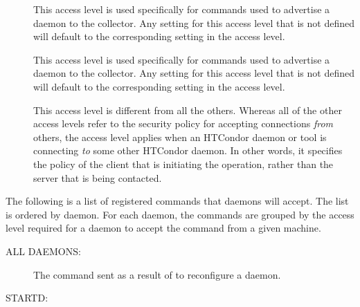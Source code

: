 \begin{description}
\item[] \label{sec-level-advertise-master} This
   access level is used specifically for commands used to advertise a
    daemon to the collector.  Any setting for this access
   level that is not defined will default to the corresponding setting
   in the  access level.

\item[] \label{sec-level-advertise-master} This
   access level is used specifically for commands used to advertise a
    daemon to the collector.  Any setting for this access
   level that is not defined will default to the corresponding setting
   in the  access level.

\item[] \label{sec-level-client} This access level is
   different from all the others.  Whereas all of the other access levels
   refer to the security policy for accepting connections \emph{from} others,
   the  access level applies when an HTCondor daemon or tool is
   connecting \emph{to} some other HTCondor daemon.  In other words, it specifies
   the policy of the client that is initiating the operation, rather than
   the server that is being contacted.

\end{description}


The following is a list of registered commands that daemons will
accept.  The list is ordered by daemon.
For each daemon, the commands are grouped by the access level
required for a daemon to accept the command from a
given machine.

ALL DAEMONS:

\begin{description}
\item[]

  The command sent as a result of  to reconfigure a daemon.
\end{description}

STARTD:

